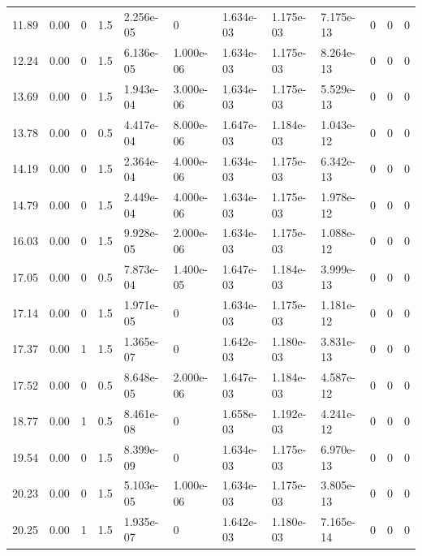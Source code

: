 \documentclass[preview]{standalone}
\begin{document}
{{\begin{tabular}{L{1.2cm}C{1.2cm} C{0.3cm}C{0.5cm} C{1.4cm}C{1.4cm} C{1.4cm}C{1.4cm} C{1.6cm}C{1.6cm} C{1.6cm}C{1.6cm}}
  11.89  &  0.00  & 0     & 1.5 &  2.256e-05  & 0  &  1.634e-03&   1.175e-03& 7.175e-13 & 0   &  0 & 0  \\ 
  12.24  &  0.00  & 0     & 1.5 &  6.136e-05  & 1.000e-06  &  1.634e-03&   1.175e-03& 8.264e-13 & 0   &  0 & 0  \\ 
  13.69  &  0.00  & 0     & 1.5 &  1.943e-04  & 3.000e-06  &  1.634e-03&   1.175e-03& 5.529e-13 & 0   &  0 & 0  \\ 
  13.78  &  0.00  & 0     & 0.5 &  4.417e-04  & 8.000e-06  &  1.647e-03&   1.184e-03& 1.043e-12 & 0   &  0 & 0  \\ 
  14.19  &  0.00  & 0     & 1.5 &  2.364e-04  & 4.000e-06  &  1.634e-03&   1.175e-03& 6.342e-13 & 0   &  0 & 0  \\ 
  14.79  &  0.00  & 0     & 1.5 &  2.449e-04  & 4.000e-06  &  1.634e-03&   1.175e-03& 1.978e-12 & 0   &  0 & 0  \\ 
  16.03  &  0.00  & 0     & 1.5 &  9.928e-05  & 2.000e-06  &  1.634e-03&   1.175e-03& 1.088e-12 & 0   &  0 & 0  \\ 
  17.05  &  0.00  & 0     & 0.5 &  7.873e-04  & 1.400e-05  &  1.647e-03&   1.184e-03& 3.999e-13 & 0   &  0 & 0  \\ 
  17.14  &  0.00  & 0     & 1.5 &  1.971e-05  & 0  &  1.634e-03&   1.175e-03& 1.181e-12 & 0   &  0 & 0  \\ 
  17.37  &  0.00  & 1     & 1.5 &  1.365e-07  & 0  &  1.642e-03&   1.180e-03& 3.831e-13 & 0   &  0 & 0  \\ 
  17.52  &  0.00  & 0     & 0.5 &  8.648e-05  & 2.000e-06  &  1.647e-03&   1.184e-03& 4.587e-12 & 0   &  0 & 0  \\ 
  18.77  &  0.00  & 1     & 0.5 &  8.461e-08  & 0  &  1.658e-03&   1.192e-03& 4.241e-12 & 0   &  0 & 0  \\ 
  19.54  &  0.00  & 0     & 1.5 &  8.399e-09  & 0  &  1.634e-03&   1.175e-03& 6.970e-13 & 0   &  0 & 0  \\ 
  20.23  &  0.00  & 0     & 1.5 &  5.103e-05  & 1.000e-06  &  1.634e-03&   1.175e-03& 3.805e-13 & 0   &  0 & 0  \\ 
  20.25  &  0.00  & 1     & 1.5 &  1.935e-07  & 0  &  1.642e-03&   1.180e-03& 7.165e-14 & 0   &  0 & 0  \\ 
\hline 
\end{tabular} 

}}
\end{document}
